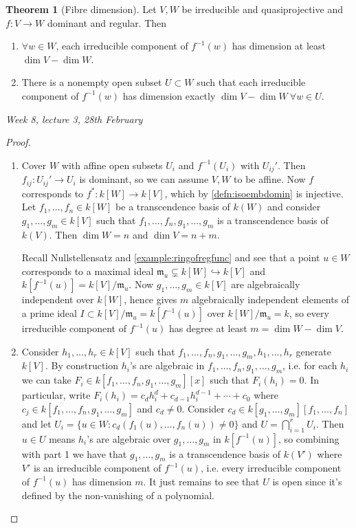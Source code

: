 \documentclass{article}
\newcommand{\m}{\mathfrak{m}}
\theoremstyle{definition}
\newtheorem{thm}[defn]{Theorem}
\begin{document}
\begin{thm}[Fibre dimension]
Let $V,W$ be irreducible and quasiprojective and $f:V\rightarrow W$ dominant and regular. Then
\begin{enumerate}
\item $\forall w\in W$, each irreducible component of $f^{-1}(w)$ has dimension at least $\dim V-\dim W$.
\item There is a nonempty open subset $U\subset W$ such that each irreducible component of $f^{-1}(w)$ has dimension exactly $\dim V-\dim W\ \forall w\in U$.
\end{enumerate}
\end{thm}

\begin{flushright}
\textit{Week 8, lecture 3, 28th February}
\end{flushright}

\begin{proof}
\begin{enumerate}
\item Cover $W$ with affine open subsets $U_i$ and $f^{-1}(U_i)$ with $U_{ij}'$. Then $f_{ij}:U_{ij}'\rightarrow U_i$ is dominant, so we can assume $V,W$ to be affine. Now $f$ corresponds to $f^\ast:k[W]\rightarrow k[V]$, which by \ref{defn:isoembdomin} is injective. Let $f_1,\ldots,f_n\in k[W]$ be a transcendence basis of $k(W)$ and consider $g_1,\ldots,g_m\in k[V]$ such that $f_1,\ldots,f_n,g_1,\ldots,g_m$ is a transcendence basis of $k(V)$. Then $\dim W=n$ and $\dim V=n+m$.

Recall Nullstellensatz and \ref{example:ringofregfunc} and see that a point $u\in W$ corresponds to a maximal ideal $\m_u\subsetneq k[W]\hookrightarrow k[V]$ and $k[f^{-1}(u)]=k[V]/\m_u$. Now $g_1,\ldots,g_m\in k[V]$ are algebraically independent over $k[W]$, hence gives $m$ algebraically independent elements of a prime ideal $I\subset k[V]/\m_u=k[f^{-1}(u)]$ over $k[W]/\m_u=k$, so every irreducible component of $f^{-1}(u)$ has degree at least $m=\dim W-\dim V$.
\item Consider $h_1,\ldots,h_r\in k[V]$ such that $f_1,\ldots,f_n,g_1,\ldots,g_m,h_1,\ldots,h_r$ generate $k[V]$. By construction $h_i$'s are algebraic in $f_1,\ldots,f_n,g_1,\ldots,g_m$, i.e. for each $h_i$ we can take $F_i\in k[f_1,\ldots,f_n,g_1,\ldots,g_m][x]$ such that $F_i(h_i)=0$. In particular, write $F_i(h_i)=c_dh_i^d+c_{d-1}h_i^{d-1}+\cdots+c_0$ where $c_j\in k[f_1,\ldots,f_n,g_1,\ldots,g_m]$ and $c_d\neq 0$. Consider $c_d\in k[g_1,\ldots,g_m][f_1,\ldots,f_n]$ and let $U_i=\{u\in W:c_d(f_1(u),\ldots,f_n(u))\neq 0\}$ and $U=\bigcap_{i=1}^rU_i$. Then $u\in U$ means $h_i$'s are algebraic over $g_1,\ldots,g_m$ in $k[f^{-1}(u)]$, so combining with part 1 we have that $g_1,\ldots,g_m$ is a transcendence basis of $k(V')$ where $V'$ is an irreducible component of $f^{-1}(u)$, i.e. every irreducible component of $f^{-1}(u)$ has dimension $m$. It just remains to see that $U$ is open since it's defined by the non-vanishing of a polynomial.
\end{enumerate}
\end{proof}
\end{document}
